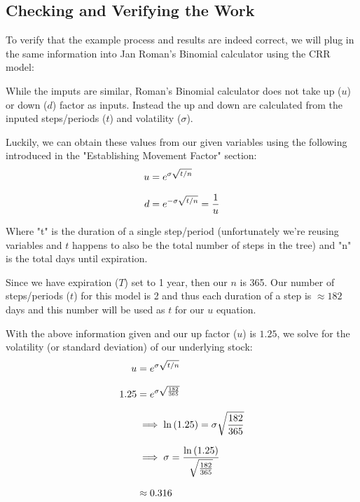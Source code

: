 \documentclass[12pt, letterpaper]{article}\usepackage{float}
\begin{document}
\subsection*{Checking and Verifying the Work}
To verify that the example process and results are indeed correct, we will plug in the same information into Jan Roman's Binomial calculator using the CRR model: %

While the imputs are similar, Roman's Binomial calculator does not take up (${u}$) or down (${d}$) factor as inputs.
Instead the up and down are calculated from the inputed steps/periods (${t}$) and volatility (${\sigma}$).

Luckily, we can obtain these values from our given variables using the following introduced in the "Establishing Movement Factor" section:
\begin{equation*}
  \setlength{\jot}{10pt}
  \begin{split}
    u
    & = e^{\sigma\sqrt{t/n}}
    \\
    d
    & = e^{-\sigma\sqrt{t/n}} = \frac{1}{u}
  \end{split}
\end{equation*}

Where "t" is the duration of a single step/period (unfortunately we're reusing variables and ${t}$ happens to also be the total number of steps in the tree)
and "n" is the total days until expiration.

Since we have expiration (${T}$) set to 1 year, then our ${n}$ is 365.
Our number of steps/periods (${t}$) for this model is 2 and thus each duration of a step is ${\approx 182}$ days and this number will be used as ${t}$ for our ${u}$ equation.

With the above information given and our up factor (${u}$) is ${1.25}$, we solve for the volatility (or standard deviation) of our underlying stock:
\begin{equation*}
  \setlength{\jot}{10pt}
  \begin{split}
    u
    & = e^{\sigma\sqrt{t/n}}
    \\
    1.25
    & = e^{\sigma\sqrt{\frac{182}{365}}}
    \\
    & \implies \ln{(1.25)} = \sigma\sqrt{\frac{182}{365}}
    \\
    & \implies \sigma = \frac{\ln{(1.25)}}{\sqrt{\frac{182}{365}}}
    \\
    & \approx 0.316
  \end{split}
\end{equation*}
\end{document}

